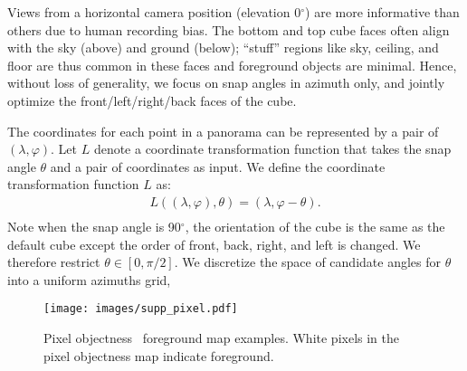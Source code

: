 Views from a horizontal camera position (elevation 0$^{\circ}$) are more informative than others due to human recording bias. The bottom and top cube faces often align with the sky (above) and  ground (below); ``stuff'' regions like sky, ceiling, and floor are thus common in these faces and foreground objects are minimal.   Hence, without loss of generality, we focus on snap angles in azimuth only, and jointly optimize the front/left/right/back faces of the cube.

The coordinates for each point in a panorama can be represented by a pair of 
$(\lambda,\varphi)$.  Let $L$ denote a coordinate transformation function that takes the snap angle $\theta$ and a pair of coordinates as input.  We define the coordinate transformation function $L$ as:
\begin{equation}
\begin{matrix}
L((\lambda,\varphi),\theta)=(\lambda,\varphi-\theta).
  \\
\end{matrix}
\label{eq:L}
\end{equation}
Note when the snap angle is 90$^{\circ}$, the orientation of the cube is the same as the default cube except the order of front, back, right, and left is changed. We therefore restrict $\theta \in [0,\pi /2]$. We discretize the space of candidate angles for $\theta$ into a uniform  azimuths grid, 





\begin{figure*}[t]
\centering
\renewcommand{\tabcolsep}{0pt}
\texttt{[image: images/supp\_pixel.pdf]}
\caption{Pixel objectness~\cite{jain2017pixel} foreground map examples. White pixels in the pixel objectness map indicate foreground.  }%
\label{fig:pixel}
\vspace{-0.2in}
\end{figure*}





